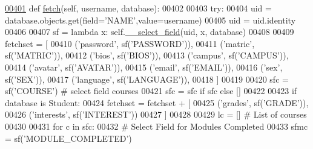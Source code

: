 \begin{DoxyCode}
\hypertarget{classProfile_1_1ProfileUnit_1_1PersProfile_l00401}{}\hyperlink{classProfile_1_1ProfileUnit_1_1PersProfile_a6786051dcc78f2f481ab6170b47acd7c}{00401}     \textcolor{keyword}{def }\hyperlink{classProfile_1_1ProfileUnit_1_1PersProfile_a6786051dcc78f2f481ab6170b47acd7c}{fetch}(self, username, database):
00402 
00403         \textcolor{keywordflow}{try}:
00404             uid = database.objects.get(field=\textcolor{stringliteral}{'NAME'},value=username)
00405             uid = uid.identity
00406 
00407             sf = \textcolor{keyword}{lambda} x: self.\hyperlink{classProfile_1_1ProfileUnit_1_1PersProfile_abc9c9fc9809b7680f9b3f6a929415692}{\_\_select\_field}(uid, x, database)
00408 
00409             fetchset = [
00410                     (\textcolor{stringliteral}{'password'},    sf(\textcolor{stringliteral}{'PASSWORD'})),
00411                     (\textcolor{stringliteral}{'matric'},      sf(\textcolor{stringliteral}{'MATRIC'})),
00412                     (\textcolor{stringliteral}{'bios'},        sf(\textcolor{stringliteral}{'BIOS'})),
00413                     (\textcolor{stringliteral}{'campus'},      sf(\textcolor{stringliteral}{'CAMPUS'})),
00414                     (\textcolor{stringliteral}{'avatar'},      sf(\textcolor{stringliteral}{'AVATAR'})),
00415                     (\textcolor{stringliteral}{'email'},       sf(\textcolor{stringliteral}{'EMAIL'})),
00416                     (\textcolor{stringliteral}{'sex'},         sf(\textcolor{stringliteral}{'SEX'})),
00417                     (\textcolor{stringliteral}{'language'},    sf(\textcolor{stringliteral}{'LANGUAGE'})),
00418             ]
00419 
00420             sfc = sf(\textcolor{stringliteral}{'COURSE'}) \textcolor{comment}{# select field courses}
00421             sfc = sfc \textcolor{keywordflow}{if} sfc \textcolor{keywordflow}{else} []
00422 
00423             \textcolor{keywordflow}{if} database \textcolor{keywordflow}{is} Student:
00424                 fetchset = fetchset + [     
00425                     (\textcolor{stringliteral}{'grades'},      sf(\textcolor{stringliteral}{'GRADE'})),
00426                     (\textcolor{stringliteral}{'interests'},   sf(\textcolor{stringliteral}{'INTEREST'}))
00427                 ]
00428 
00429                 lc = [] \textcolor{comment}{# List of courses}
00430                 
00431                 \textcolor{keywordflow}{for} c \textcolor{keywordflow}{in} sfc:
00432                     \textcolor{comment}{# Select Field for Modules Completed}
00433                     sfmc = sf(\textcolor{stringliteral}{'MODULE\_COMPLETED'})

\end{DoxyCode}
